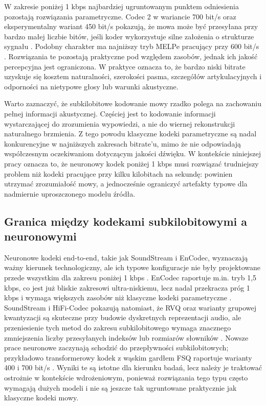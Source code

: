 W zakresie poniżej 1 kbps najbardziej ugruntowanym punktem odniesienia pozostają rozwiązania parametryczne. Codec 2 w wariancie 700 bit/s oraz eksperymentalny wariant 450 bit/s pokazują, że mowa może być przesyłana przy bardzo małej liczbie bitów, jeśli koder wykorzystuje silne założenia o strukturze sygnału \cite{Rowe2019Codec2,Rowe2021Codec2450}. Podobny charakter ma najniższy tryb MELPe pracujący przy 600 bit/s \cite{NATO2015STANAG4591}. Rozwiązania te pozostają praktyczne pod względem zasobów, jednak ich jakość percepcyjna jest ograniczona. W praktyce oznacza to, że bardzo niski bitrate uzyskuje się kosztem naturalności, szerokości pasma, szczegółów artykulacyjnych i odporności na nietypowe głosy lub warunki akustyczne.

Warto zaznaczyć, że subkilobitowe kodowanie mowy rzadko polega na zachowaniu pełnej informacji akustycznej. Częściej jest to kodowanie informacji wystarczającej do zrozumienia wypowiedzi, a nie do wiernej rekonstrukcji naturalnego brzmienia. Z tego powodu klasyczne kodeki parametryczne są nadal konkurencyjne w najniższych zakresach bitrate'u, mimo że nie odpowiadają współczesnym oczekiwaniom dotyczącym jakości dźwięku. W kontekście niniejszej pracy oznacza to, że neuronowy kodek poniżej 1 kbps musi rozwiązać trudniejszy problem niż kodeki pracujące przy kilku kilobitach na sekundę: powinien utrzymać zrozumiałość mowy, a jednocześnie ograniczyć artefakty typowe dla nadmiernie uproszczonego modelu źródła.

\subsection{Granica między kodekami subkilobitowymi a neuronowymi}
\label{subsec:granica-subkilobit-neural}

Neuronowe kodeki end-to-end, takie jak SoundStream i EnCodec, wyznaczają ważny kierunek technologiczny, ale ich typowe konfiguracje nie były projektowane przede wszystkim dla zakresu poniżej 1 kbps \cite{Zeghidour2021SoundStream,Defossez2022Encodec}. EnCodec raportuje m.in. tryb 1{,}5 kbps, co jest już bliskie zakresowi ultra-niskiemu, lecz nadal przekracza próg 1 kbps i wymaga większych zasobów niż klasyczne kodeki parametryczne \cite{Defossez2022Encodec}. SoundStream i HiFi-Codec pokazują natomiast, że RVQ oraz warianty grupowej kwantyzacji są skuteczne przy budowie dyskretnych reprezentacji audio, ale przeniesienie tych metod do zakresu subkilobitowego wymaga znacznego zmniejszenia liczby przesyłanych indeksów lub rozmiarów słowników \cite{Zeghidour2021SoundStream,Yang2023HiFiCodec}. Nowsze prace neuronowe zaczynają schodzić do przepływności subkilobitowych; przykładowo transformerowy kodek z wąskim gardłem FSQ raportuje warianty 400 i 700 bit/s \cite{Parker2025ScalingTransformers}. Wyniki te są istotne dla kierunku badań, lecz należy je traktować ostrożnie w kontekście wdrożeniowym, ponieważ rozwiązania tego typu często wymagają dużych modeli i nie są jeszcze tak ugruntowane praktycznie jak klasyczne kodeki mowy.

